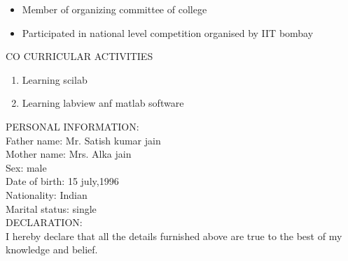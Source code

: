 \documentclass[11pt,a4paper]{article}
\begin{document}
\begin{flushleft}
	          \begin{itemize}
	          	\item Member of organizing committee of college\\
	          	\item Participated in national level competition organised by IIT bombay\\
	          	
	          \end{itemize}
	          \textsf{CO CURRICULAR ACTIVITIES}
	          \begin{enumerate}
	          	\item Learning scilab\\
	          	\item Learning labview anf matlab software	
	          \end{enumerate}
	          \textsf{PERSONAL INFORMATION:}\\ 
	          \medskip
	          Father name: Mr. Satish kumar jain\\
	          Mother name: Mrs. Alka jain\\
	          Sex: male\\
	          Date of birth: 15 july,1996\\
	          Nationality: Indian\\
	          Marital status: single\\
	          \medskip
	          \textsf{ DECLARATION: }\\
	          I hereby declare that all the details furnished above are true to the best of my knowledge and belief.\\
	          \medskip
	          
\end{flushleft}

 
\end{document}
